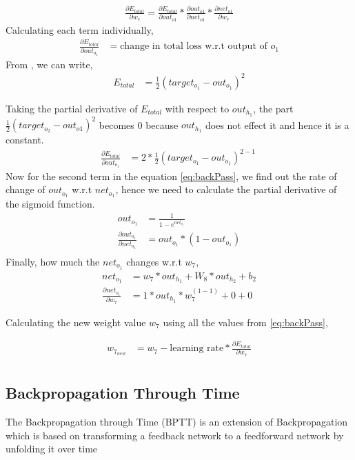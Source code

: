 \begin{align}
    \frac{\partial E_{total}}{\partial w_{7}} = \frac{\partial E_{total}}{\partial out_{o1}} * \frac{\partial out_{o1}}{\partial net_{o1}} * \frac{\partial net_{o1}}{\partial w_{7}} \label{eq:backPass}
\end{align}
Calculating each term individually,
\begin{align}
    \frac{\partial E_{total} }{\partial out_{o_{1}}} &= \text{change in total loss w.r.t output of $o_{1}$}
\end{align}
From , we can write,
\begin{align}
    E_{total} &= \frac{1}{2}(target_{o_{1}} - out_{o_{1}})^{2}
\end{align}

Taking the partial derivative of $E_{total}$ with respect to $out_{h_{1}}$, the part $\frac{1}{2}(target_{o_{2}} - out_{o{1}})^{2}$ becomes 0 because $out_{h_{1}}$ does not effect it and hence it is a constant.
\begin{align}
    \frac{\partial E_{total}}{\partial out_{o_{1}}} &= 2 * \frac{1}{2}(target_{o_{1}} - out_{o_{1}})^{2 - 1} \
\end{align}
Now for the second term in the equation \ref{eq:backPass}, we find out the rate of change of $out_{o_{1}}$ w.r.t $net_{o_{1}}$, hence we need to calculate the partial derivative of the sigmoid function. 
\begin{align}
    out_{o_{1}} &= \frac{1}{1-e^{net_{o_{1}}}}\\
    \frac{\partial out_{o_{1}}}{\partial net_{o_{1}}} &=  out_{o_{1}}*(1-out_{o_{1}}) \\
\end{align}
Finally, how much the $net_{o_{1}}$ changes w.r.t $w_{7}$,
\begin{align}
    net_{o_{1}} &= w_{7} * out_{h_{1}} + W_{8} * out_{h_{2}} + b_{2}   \\
    \frac{\partial net_{o_{1}}}{\partial w_{7}} &=  1 * out_{h_{1}} * w_{7}^{(1 - 1)} + 0 + 0
\end{align}

Calculating the new weight value $w_{7}$ using all the values from \ref{eq:backPass}, 

\begin{align}
    w_{7_{new}} &= w_{7} -\text{learning rate} * \frac{\partial E_{total}}{\partial w_{7}} \\ 
\end{align}

\subsection{Backpropagation Through Time}
The Backpropagation through Time (BPTT) is an extension of Backpropagation which is based on transforming a feedback network to a feedforward network by unfolding it over time \cite{ahmad2004recurrent}  

